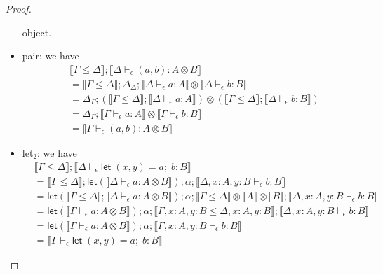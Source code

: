 \documentclass[acmsmall,screen,review]{acmart}
\newcommand{\ms}[1]{\ensuremath{\mathsf{#1}}}
\newcommand{\letexpr}[3]{\ensuremath{\ms{let}\;#1 = #2;\;#3}}
\newcommand{\bhyp}[2]{#1 : #2}
\newcommand{\hasty}[4]{#1 \vdash_{#2} #3: {#4}}
\newcommand{\brle}[1]{{\textsf{#1}}}
\newcommand{\dnt}[1]{\llbracket{#1}\rrbracket}
\newcommand{\dmor}[1]{{\Delta}_{#1}}
\newcommand{\lmor}[1]{\ms{let}(#1)}
\begin{document}
\begin{proof}
\begin{itemize}
    object.
    \item \brle{pair}: we have
    \begin{equation}
      \begin{aligned}
        & \dnt{\Gamma \leq \Delta} ; \dnt{\hasty{\Delta}{\epsilon}{(a, b)}{A \otimes B}} \\
        & = \dnt{\Gamma \leq \Delta} 
          ; \dmor{\Delta}
          ; \dnt{\hasty{\Delta}{\epsilon}{a}{A}} \otimes \dnt{\hasty{\Delta}{\epsilon}{b}{B}} \\
        & = \dmor{\Gamma}
          ; (\dnt{\Gamma \leq \Delta} ; \dnt{\hasty{\Delta}{\epsilon}{a}{A}}) \otimes
          (\dnt{\Gamma \leq \Delta} ; \dnt{\hasty{\Delta}{\epsilon}{b}{B}}) \\
        & = \dmor{\Gamma}
          ; \dnt{\hasty{\Gamma}{\epsilon}{a}{A}} \otimes \dnt{\hasty{\Gamma}{\epsilon}{b}{B}} \\
        & = \dnt{\hasty{\Gamma}{\epsilon}{(a, b)}{A \otimes B}}
      \end{aligned}
    \end{equation}
    \item \brle{let$_2$}: we have
    \begin{equation}
      \begin{aligned}
        & \dnt{\Gamma \leq \Delta} ; \dnt{\hasty{\Delta}{\epsilon}{\letexpr{(x, y)}{a}{b}}{B}} \\
        & = \dnt{\Gamma \leq \Delta} 
          ; \lmor{\dnt{\hasty{\Delta}{\epsilon}{a}{A \otimes B}}}
          ; \alpha 
          ; \dnt{\hasty{\Delta, \bhyp{x}{A}, \bhyp{y}{B}}{\epsilon}{b}{B}} \\
        & = \lmor{\dnt{\Gamma \leq \Delta} ; \dnt{\hasty{\Delta}{\epsilon}{a}{A \otimes B}}}
          ; \alpha
          ; \dnt{\Gamma \leq \Delta} \otimes \dnt{A} \otimes \dnt{B}
          ; \dnt{\hasty{\Delta, \bhyp{x}{A}, \bhyp{y}{B}}{\epsilon}{b}{B}} \\
        & = \lmor{\dnt{\hasty{\Gamma}{\epsilon}{a}{A \otimes B}}}
          ; \alpha
          ; \dnt{\Gamma, \bhyp{x}{A}, \bhyp{y}{B} \leq \Delta, \bhyp{x}{A}, \bhyp{y}{B}}
          ; \dnt{\hasty{\Delta, \bhyp{x}{A}, \bhyp{y}{B}}{\epsilon}{b}{B}} \\
        & = \lmor{\dnt{\hasty{\Gamma}{\epsilon}{a}{A \otimes B}}}
          ; \alpha
          ; \dnt{\hasty{\Gamma, \bhyp{x}{A}, \bhyp{y}{B}}{\epsilon}{b}{B}} \\
        & = \dnt{\hasty{\Gamma}{\epsilon}{\letexpr{(x, y)}{a}{b}}{B}}
      \end{aligned}

\end{equation}
\end{itemize}
\end{proof}
\end{document}
